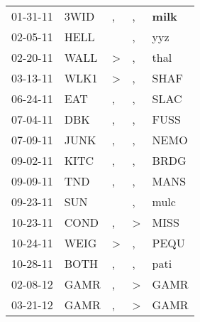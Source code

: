 \begin{supertabular}{p{0.07\textwidth}p{0.06\textwidth}p{0.02\textwidth}p{0.02\textwidth}p{0.06\textwidth}}
 01-31-11\textsuperscript{} &  3WID\textsuperscript{} &             , &             , &  \textbf{milk\textsuperscript{}} \\
 02-05-11\textsuperscript{} &  HELL\textsuperscript{} &               &             , &            yyz\textsuperscript{} \\
 02-20-11\textsuperscript{} &  WALL\textsuperscript{} &  \textgreater &             , &           thal\textsuperscript{} \\
 03-13-11\textsuperscript{} &  WLK1\textsuperscript{} &  \textgreater &             , &           SHAF\textsuperscript{} \\
 06-24-11\textsuperscript{} &   EAT\textsuperscript{} &             , &             , &           SLAC\textsuperscript{} \\
 07-04-11\textsuperscript{} &   DBK\textsuperscript{} &             , &             , &           FUSS\textsuperscript{} \\
 07-09-11\textsuperscript{} &  JUNK\textsuperscript{} &             , &             , &           NEMO\textsuperscript{} \\
 09-02-11\textsuperscript{} &  KITC\textsuperscript{} &             , &             , &           BRDG\textsuperscript{} \\
 09-09-11\textsuperscript{} &   TND\textsuperscript{} &             , &             , &           MANS\textsuperscript{} \\
 09-23-11\textsuperscript{} &   SUN\textsuperscript{} &               &             , &           mulc\textsuperscript{} \\
 10-23-11\textsuperscript{} &  COND\textsuperscript{} &             , &  \textgreater &           MISS\textsuperscript{} \\
 10-24-11\textsuperscript{} &  WEIG\textsuperscript{} &  \textgreater &             , &           PEQU\textsuperscript{} \\
 10-28-11\textsuperscript{} &  BOTH\textsuperscript{} &             , &             , &           pati\textsuperscript{} \\
 02-08-12\textsuperscript{} &  GAMR\textsuperscript{} &             , &  \textgreater &           GAMR\textsuperscript{} \\
 03-21-12\textsuperscript{} &  GAMR\textsuperscript{} &             , &  \textgreater &           GAMR\textsuperscript{} \\

\end{supertabular}
